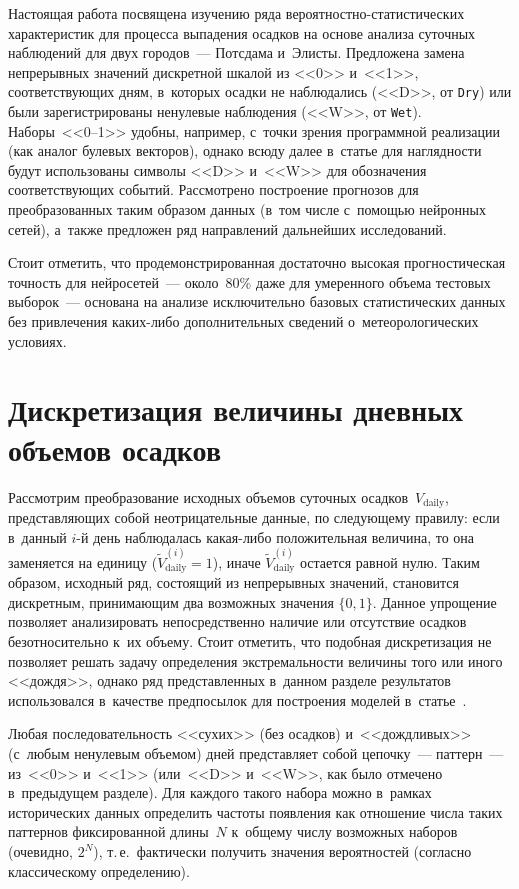 \begin{multicols}{2}
Настоящая работа посвящена изучению ряда вероятностно-статистических
характеристик для процесса выпадения осадков на основе анализа суточных
наблюдений для двух городов~--- Потсдама и~Элисты. Предложена замена
непрерывных значений дискретной шкалой из <<0>> и~<<1>>, со\-от\-вет\-ст\-ву\-ющих
дням, в~которых осадки не наблюдались (<<D>>, от \verb"Dry") или были
зарегистрированы ненулевые наблюдения (<<W>>, от \verb"Wet"). Наборы~<<0--1>>
удобны, например, с~точки зрения программной реализации (как аналог булевых
векторов), однако всюду далее в~статье для наглядности будут использованы
символы <<D>> и~<<W>> для обозначения со\-от\-вет\-ст\-ву\-ющих событий.
Рассмотрено по\-стро\-ение прогнозов для преобразованных таким образом данных
(в~том числе с~помощью нейронных сетей), а~также предложен ряд направлений
дальнейших исследований. 

Стоит отметить, что 
продемонстрированная достаточно высокая прогностическая точность для нейросетей~--- 
около~80\% даже для умеренного объема тестовых выборок~--- 
основана на анализе исключительно базовых статистических данных без 
привлечения ка\-ких-ли\-бо дополнительных сведений о~метеорологических условиях.

\section{Дискретизация величины дневных объемов осадков}

Рассмотрим преобразование исходных объемов суточных осадков~$V_{\mathrm{daily}}$,
представляющих собой неотрицательные данные, по следующему правилу: если 
в~данный $i$-й день наблюдалась ка\-кая-ли\-бо положительная величина, то она
заменяется на единицу ($\widetilde{V}_{\mathrm{daily}}^{(i)}=1$), иначе
$\widetilde{V}_{\mathrm{daily}}^{(i)}$ остается равной нулю. Таким образом, исходный ряд,
состоящий из непрерывных значений, становится дискретным, принимающим два
возможных значения $\{0,1\}$. Данное упрощение позволяет анализировать
непосредственно наличие или отсутствие осадков безотносительно к~их объему.
Стоит отметить, что подобная дискретизация не позволяет решать задачу
определения экстремальности величины того или иного <<дождя>>, однако ряд
представленных в~данном разделе результатов использовался в~качестве
предпосылок для построения моделей в~\mbox{статье}~\cite{Gorshenin2017a}.

Любая последовательность <<сухих>> (без осадков) и~<<дождливых>> (с~любым
ненулевым объемом) дней представляет собой цепочку~--- паттерн~--- 
из~<<0>> и~<<1>> (или~<<D>> и~<<W>>, как было отмечено в~предыду\-щем разделе). Для
каждого такого набора можно в~рамках исторических данных определить частоты
появления как отношение числа таких паттернов фиксированной длины~$N$ 
к~общему числу возможных наборов (очевидно, $2^N$), т.\,е.\ фактически
получить значения вероятностей (согласно классическому определению).




\end{multicols}
